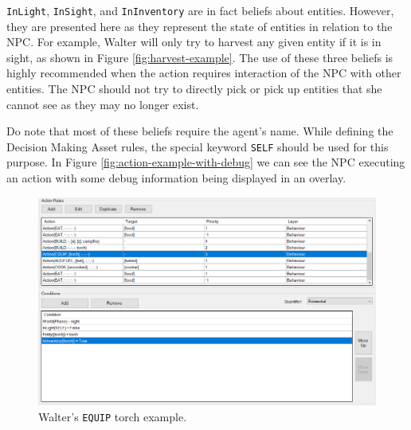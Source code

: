 \texttt{InLight}, \texttt{InSight}, and \texttt{InInventory} are in fact beliefs about entities.
However, they are presented here as they represent the state of entities in relation to the \ac{NPC}.
For example, Walter will only try to harvest any given entity if it is in sight, as shown in Figure \ref{fig:harvest-example}.
The use of these three beliefs is highly recommended when the action requires interaction of the \ac{NPC} with other entities.
The \ac{NPC} should not try to directly pick or pick up entities that she cannot see as they may no longer exist.

Do note that most of these beliefs require the agent's name.
While defining the Decision Making Asset rules, the special keyword \texttt{SELF} should be used for this purpose.
In Figure \ref{fig:action-example-with-debug} we can see the \ac{NPC} executing an action with some debug information being displayed in an overlay.

\begin{figure}
  \centering
  \includegraphics[width=\textwidth]{./Images/ininventory-example}
  \caption{Walter's \texttt{EQUIP} torch example.}
  \label{fig:equiptorch-example}
\end{figure}

